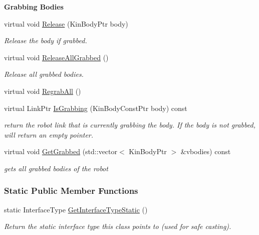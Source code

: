 \begin{Indent}{\bf Grabbing Bodies}
\begin{DoxyCompactItemize}
virtual void \hyperlink{classOpenRAVE_1_1RobotBase_ada9b12e106deb259af6c3f9f2d8589c1}{Release} (KinBodyPtr body)
\begin{DoxyCompactList}\small\item\em Release the body if grabbed. \item\end{DoxyCompactList}\item 
virtual void \hyperlink{classOpenRAVE_1_1RobotBase_a786014c730e245029cf6d944eb65ee2d}{ReleaseAllGrabbed} ()
\begin{DoxyCompactList}\small\item\em Release all grabbed bodies. \item\end{DoxyCompactList}\item 
virtual void \hyperlink{classOpenRAVE_1_1RobotBase_ac96a4eead413884c18f29cbf299ede3a}{RegrabAll} ()
\item 
virtual LinkPtr \hyperlink{classOpenRAVE_1_1RobotBase_a10ff30e0c1c04abfcbf5ce480a82330f}{IsGrabbing} (KinBodyConstPtr body) const 
\begin{DoxyCompactList}\small\item\em return the robot link that is currently grabbing the body. If the body is not grabbed, will return an empty pointer. \item\end{DoxyCompactList}\item 
virtual void \hyperlink{classOpenRAVE_1_1RobotBase_a39f91578d76bc2c4f2182aeb6c49a2ef}{GetGrabbed} (std::vector$<$ KinBodyPtr $>$ \&vbodies) const 
\begin{DoxyCompactList}\small\item\em gets all grabbed bodies of the robot \item\end{DoxyCompactList}\end{DoxyCompactItemize}
\end{Indent}
\subsubsection*{Static Public Member Functions}
\begin{DoxyCompactItemize}
\item 
\hypertarget{classOpenRAVE_1_1RobotBase_affeafe65e7c4094f282d273dedbf069b}{
static InterfaceType \hyperlink{classOpenRAVE_1_1RobotBase_affeafe65e7c4094f282d273dedbf069b}{GetInterfaceTypeStatic} ()}
\label{classOpenRAVE_1_1RobotBase_affeafe65e7c4094f282d273dedbf069b}

\begin{DoxyCompactList}\small\item\em Return the static interface type this class points to (used for safe casting). \item\end{DoxyCompactList}\end{DoxyCompactItemize}
